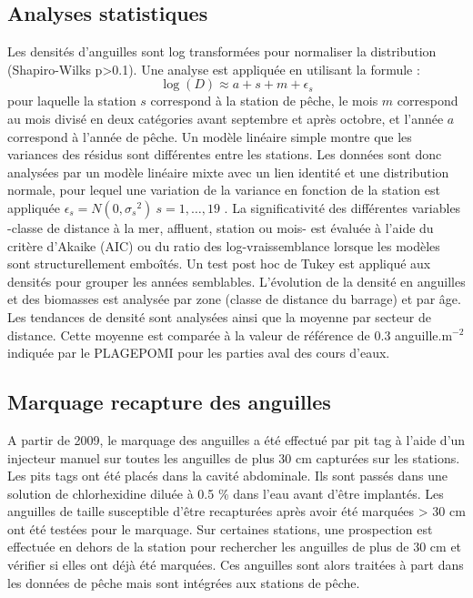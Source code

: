 \documentclass[10pt,twocolumn,titlepage,twoside]{article}\usepackage[]{graphicx}\usepackage[]{xcolor}
\begin{document}
\subsection{Analyses statistiques}
%
Les densités d'anguilles sont log transformées pour
normaliser la distribution (Shapiro-Wilks p{\textgreater}0.1). Une
analyse est appliquée en utilisant la formule :
\begin{equation*}
\log (D){\approx}a+s+m+\epsilon_s
\end{equation*}
pour laquelle la station $s$ correspond à la station de pêche, le mois $m$
correspond au mois divisé en deux catégories avant septembre et après octobre,
et l'année $a$ correspond à l'année de pêche. Un modèle linéaire simple montre
que les variances des résidus sont différentes entre les stations. Les
 données sont donc analysées par un modèle linéaire mixte
 \citep{pinheiro_nlme_2013} avec un lien identité et une distribution normale, 
 pour lequel une variation de la variance en fonction de la station est appliquée $\epsilon_s=N(0,{\sigma_{s}}^2)
~s=1,\dots,19$ \citep{zuur_mixed_2009}. La significativité des différentes
variables -classe de distance à la mer, affluent, station ou mois- est évaluée à
l'aide du critère d'Akaike (AIC) ou du ratio des log-vraissemblance lorsque les modèles sont structurellement emboîtés. Un test
post hoc de Tukey est appliqué aux densités pour grouper les années semblables.
L'évolution de la densité en anguilles et des biomasses est analysée par zone (classe de
distance du barrage) et par âge. Les tendances de densité sont analysées ainsi
que la moyenne par secteur de distance. Cette moyenne est comparée à la valeur de référence de 0.3
anguille.m$^{-2}$ indiquée par le PLAGEPOMI pour les parties aval des cours
d'eaux.
%
\subsection{Marquage recapture des anguilles}
%
A partir de 2009, le marquage des anguilles a été effectué par pit tag à l'aide
d'un injecteur manuel sur toutes les anguilles de plus 30 cm capturées sur les stations. Les
pits tags ont été placés dans la cavité abdominale.
Ils sont passés dans une solution de chlorhexidine diluée à 0.5 \% dans l'eau 
avant d'être
implantés.
Les anguilles de taille susceptible d'être recapturées après avoir été marquées > 30 cm ont été testées pour le marquage. 
Sur certaines stations, une prospection est effectuée en dehors de la station
pour rechercher les anguilles de plus de 30 cm et vérifier si elles ont déjà
été marquées.
Ces anguilles sont alors traitées à part dans les données de pêche mais sont intégrées aux stations de pêche.
\end{document}
